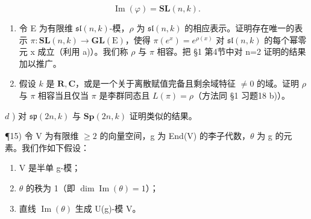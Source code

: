\[
\operatorname{Im} (\varphi) = \mathbf {S L} (n, k).
\]

\begin{enumerate}
\def\labelenumi{\alph{enumi})}
\setcounter{enumi}{1}
\item
  令 E 为有限维 \(\mathfrak{sl}(n,k)\)-模，\(\rho\) 为 \(\mathfrak{sl}(n,k)\) 的相应表示。证明存在唯一的表示 \(\pi:\mathbf{SL}(n,k)\to\mathbf{GL}(\mathrm{E})\)，使得 \(\pi(e^{x})=e^{\rho(x)}\) 对 \(\mathfrak{sl}(n,k)\) 的每个幂零元 x 成立（利用 a)）。我们称 \(\rho\) 与 \(\pi\) 相容。把 §1 第4节中对 n=2 证明的结果加以推广。
\item
  假设 \(k\) 是 \(\mathbf{R}, \mathbf{C}\)，或是一个关于离散赋值完备且剩余域特征 \(\neq 0\) 的域。证明 \(\rho\) 与 \(\pi\) 相容当且仅当 \(\pi\) 是李群同态且 \(L(\pi) = \rho\)（方法同 §1 习题18 b)）。
\end{enumerate}

\(d\) ) 对 \(\mathfrak{sp}(2n,k)\) 与 \(\mathbf{Sp}(2n,k)\) 证明类似的结果。

¶15) 令 V 为有限维 \(\geq 2\) 的向量空间，g 为 End(V) 的李子代数，\(\theta\) 为 g 的元素。我们作如下假设：

\begin{enumerate}
\def\labelenumi{(\roman{enumi})}
\item
  V 是半单 g-模；
\item
  \(\theta\) 的秩为 1（即 \(\dim \operatorname{Im}(\theta) = 1\)）；
\item
  直线 \(\operatorname{Im}(\theta)\) 生成 U(g)-模 V。
\end{enumerate}

